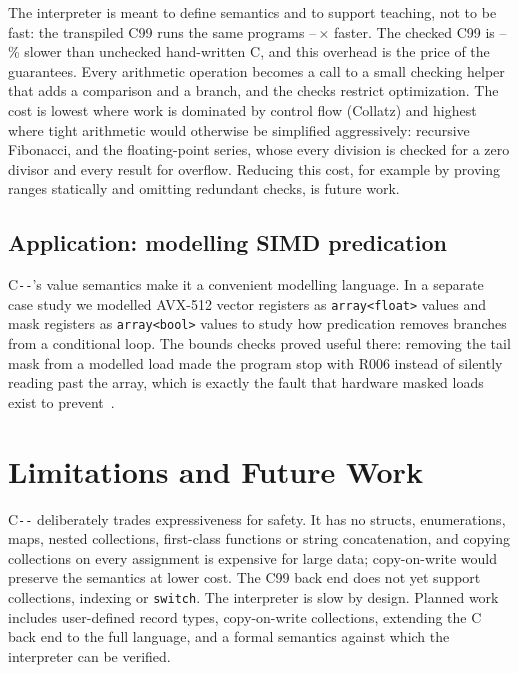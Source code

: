 \documentclass[conference]{IEEEtran}
\newcommand{\cmm}{C\texttt{-{}-}}
\begin{document}
The interpreter is meant to define semantics and to support teaching, not to be fast: the transpiled C99
runs the same programs \benchSpeedupMin--\benchSpeedupMax\,$\times$ faster. The checked C99 is
\benchOverheadMin--\benchOverheadMax\% slower than unchecked hand-written C, and this overhead is the price of
the guarantees. Every arithmetic operation becomes a call to a small checking helper that adds a comparison
and a branch, and the checks restrict optimization. The cost is lowest where work is dominated by control
flow (Collatz) and highest where tight arithmetic would otherwise be simplified aggressively: recursive
Fibonacci, and the floating-point series, whose every division is checked for a zero divisor and every
result for overflow. Reducing this cost, for example by proving ranges statically and omitting redundant
checks, is future work.

\subsection{Application: modelling SIMD predication}
\cmm{}'s value semantics make it a convenient modelling language. In a separate case study we modelled
AVX-512 vector registers as \texttt{array<float>} values and mask registers as \texttt{array<bool>} values to
study how predication removes branches from a conditional loop. The bounds checks proved useful there:
removing the tail mask from a modelled load made the program stop with R006 instead of silently reading past
the array, which is exactly the fault that hardware masked loads exist to prevent~\cite{ifconversion}.

\section{Limitations and Future Work}
\cmm{} deliberately trades expressiveness for safety. It has no structs, enumerations, maps, nested
collections, first-class functions or string concatenation, and copying collections on every assignment is
expensive for large data; copy-on-write would preserve the semantics at lower cost. The C99 back end does
not yet support collections, indexing or \texttt{switch}. The interpreter is slow by design. Planned work
includes user-defined record types, copy-on-write collections, extending the C back end to the full language,
and a formal semantics against which the interpreter can be verified.
\end{document}
